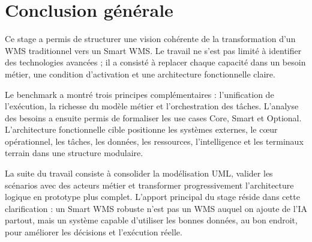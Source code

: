\chapter*{Conclusion générale}
Ce stage a permis de structurer une vision cohérente de la transformation d'un WMS traditionnel vers un Smart WMS. Le travail ne s'est pas limité à identifier des technologies avancées ; il a consisté à replacer chaque capacité dans un besoin métier, une condition d'activation et une architecture fonctionnelle claire.

Le benchmark a montré trois principes complémentaires : l'unification de l'exécution, la richesse du modèle métier et l'orchestration des tâches. L'analyse des besoins a ensuite permis de formaliser les use cases Core, Smart et Optional. L'architecture fonctionnelle cible positionne les systèmes externes, le cœur opérationnel, les tâches, les données, les ressources, l'intelligence et les terminaux terrain dans une structure modulaire.

La suite du travail consiste à consolider la modélisation UML, valider les scénarios avec des acteurs métier et transformer progressivement l'architecture logique en prototype plus complet. L'apport principal du stage réside dans cette clarification : un Smart WMS robuste n'est pas un WMS auquel on ajoute de l'IA partout, mais un système capable d'utiliser les bonnes données, au bon endroit, pour améliorer les décisions et l'exécution réelle.
